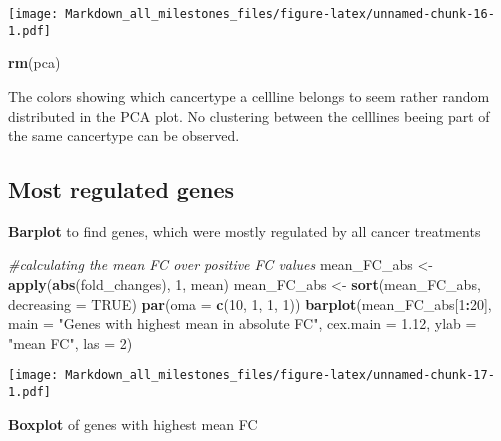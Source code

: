 \documentclass[]{article}
\newenvironment{Shaded}{\begin{snugshade}}{\end{snugshade}}
\newcommand{\CommentTok}[1]{\textcolor[rgb]{0.56,0.35,0.01}{\textit{#1}}}
\newcommand{\DataTypeTok}[1]{\textcolor[rgb]{0.13,0.29,0.53}{#1}}
\newcommand{\DecValTok}[1]{\textcolor[rgb]{0.00,0.00,0.81}{#1}}
\newcommand{\FloatTok}[1]{\textcolor[rgb]{0.00,0.00,0.81}{#1}}
\newcommand{\KeywordTok}[1]{\textcolor[rgb]{0.13,0.29,0.53}{\textbf{#1}}}
\newcommand{\NormalTok}[1]{#1}
\newcommand{\OperatorTok}[1]{\textcolor[rgb]{0.81,0.36,0.00}{\textbf{#1}}}
\newcommand{\OtherTok}[1]{\textcolor[rgb]{0.56,0.35,0.01}{#1}}
\newcommand{\StringTok}[1]{\textcolor[rgb]{0.31,0.60,0.02}{#1}}
\begin{document}
\texttt{[image: Markdown\_all\_milestones\_files/figure-latex/unnamed-chunk-16-1.pdf]}

\begin{Shaded}
\begin{Highlighting}[]
\KeywordTok{rm}\NormalTok{(pca)}
\end{Highlighting}
\end{Shaded}

The colors showing which cancertype a cellline belongs to seem rather
random distributed in the PCA plot. No clustering between the celllines
beeing part of the same cancertype can be observed.

\hypertarget{most-regulated-genes}{%
\subsection{Most regulated genes}\label{most-regulated-genes}}

\textbf{Barplot} to find genes, which were mostly regulated by all
cancer treatments

\begin{Shaded}
\begin{Highlighting}[]
\CommentTok{#calculating the mean FC over positive FC values}
\NormalTok{mean_FC_abs <-}\StringTok{ }\KeywordTok{apply}\NormalTok{(}\KeywordTok{abs}\NormalTok{(fold_changes), }\DecValTok{1}\NormalTok{, mean)}
\NormalTok{mean_FC_abs <-}\StringTok{ }\KeywordTok{sort}\NormalTok{(mean_FC_abs, }\DataTypeTok{decreasing =} \OtherTok{TRUE}\NormalTok{)}
\KeywordTok{par}\NormalTok{(}\DataTypeTok{oma =} \KeywordTok{c}\NormalTok{(}\DecValTok{10}\NormalTok{, }\DecValTok{1}\NormalTok{, }\DecValTok{1}\NormalTok{, }\DecValTok{1}\NormalTok{))}
\KeywordTok{barplot}\NormalTok{(mean_FC_abs[}\DecValTok{1}\OperatorTok{:}\DecValTok{20}\NormalTok{], }
        \DataTypeTok{main =} \StringTok{"Genes with highest mean in absolute FC"}\NormalTok{,}
        \DataTypeTok{cex.main =} \FloatTok{1.12}\NormalTok{,}
        \DataTypeTok{ylab =} \StringTok{"mean FC"}\NormalTok{, }
        \DataTypeTok{las =} \DecValTok{2}\NormalTok{)}
\end{Highlighting}
\end{Shaded}

\texttt{[image: Markdown\_all\_milestones\_files/figure-latex/unnamed-chunk-17-1.pdf]}

\textbf{Boxplot} of genes with highest mean FC
\end{document}
